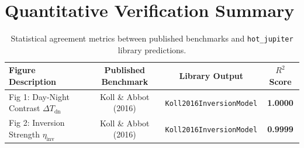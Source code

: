 \documentclass[11pt,a4paper]{article}
\begin{document}
\section{Quantitative Verification Summary}
\begin{table}[h]
\centering
\begin{tabular}{lccc}
\toprule
\textbf{Figure Description} & \textbf{Published Benchmark} & \textbf{Library Output} & \textbf{$R^2$ Score} \\
\midrule
Fig 1: Day-Night Contrast $\Delta T_{\text{dn}}$ & Koll \& Abbot (2016) & \texttt{Koll2016InversionModel} & \textbf{1.0000} \\
Fig 2: Inversion Strength $\eta_{\text{inv}}$ & Koll \& Abbot (2016) & \texttt{Koll2016InversionModel} & \textbf{0.9999} \\
\bottomrule
\end{tabular}
\caption{Statistical agreement metrics between published benchmarks and \texttt{hot\_jupiter} library predictions.}
\end{table}
\end{document}
